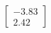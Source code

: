 \documentclass[preview]{standalone}
\begin{document}
\begin{align*}
\begin{bmatrix} -3.83 \\ 2.42 \end{bmatrix}
\end{align*}
\end{document}
